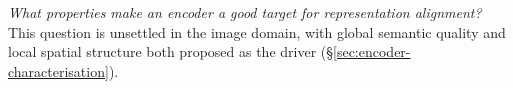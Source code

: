 \documentclass[12pt,a4paper,twoside]{report}
\begin{document}
%

\emph{What properties make an encoder a good target for representation alignment?} This question is unsettled in the image domain, with global semantic quality and local spatial structure both proposed as the driver (\S\ref{sec:encoder-characterisation}).
\end{document}
